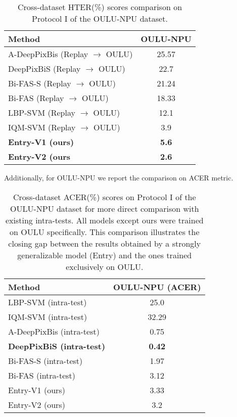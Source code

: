 \documentclass[10pt,twocolumn,letterpaper]{article}
\begin{document}
\begin{table}[h]
  \centering
  \begin{tabular}{@{}lc@{}}
    \toprule
    \textbf{Method} & \textbf{OULU-NPU} \\
    \midrule
    \midrule
    A-DeepPixBis (Replay $\rightarrow$ OULU)\cite{DeepPixBis} & 25.57 \\
    DeepPixBiS (Replay $\rightarrow$ OULU)\cite{DeepPix} & 22.7 \\
    Bi-FAS-S (Replay $\rightarrow$ OULU)\cite{Bi-FPNFAS} & 21.24 \\
    Bi-FAS (Replay $\rightarrow$ OULU)\cite{Bi-FPNFAS} & 18.33 \\
    LBP-SVM (Replay $\rightarrow$ OULU)\cite{DeepPix} & 12.1 \\
    IQM-SVM (Replay $\rightarrow$ OULU)\cite{IQM} & 3.9 \\
    \textbf{Entry-V1 (ours)} & \textbf{5.6} \\
    \textbf{Entry-V2 (ours} & \textbf{2.6} \\
    \bottomrule
  \end{tabular}
  \caption{Cross-dataset HTER(\%) scores comparison on Protocol I of the OULU-NPU dataset.}
  \label{tab:cross-test}
\end{table}

Additionally, for OULU-NPU we report the comparison on ACER metric.

\begin{table}[h]
  \centering
  \begin{tabular}{@{}lc@{}}
    \toprule
    \textbf{Method} & \textbf{OULU-NPU (ACER)} \\
    \midrule
    \midrule
    LBP-SVM (intra-test)\cite{DeepPix} & 25.0 \\
    IQM-SVM (intra-test)\cite{IQM} & 32.29 \\
    A-DeepPixBis (intra-test)\cite{DeepPixBis} & 0.75 \\
    \textbf{DeepPixBiS (intra-test)}\cite{DeepPix} & \textbf{0.42} \\
    Bi-FAS-S (intra-test)\cite{Bi-FPNFAS} & 1.97\\
    Bi-FAS (intra-test)\cite{Bi-FPNFAS} & 3.12\\
    Entry-V1 (ours) & 3.33 \\
    Entry-V2 (ours) & 3.2 \\
    \bottomrule
  \end{tabular}
  \caption{Cross-dataset ACER(\%) scores on Protocol I of the OULU-NPU dataset for more direct comparison with existing intra-tests. All models except ours were trained on OULU specifically. This comparison illustrates the closing gap between the results obtained by a strongly generalizable model (Entry) and the ones trained exclusively on OULU.}
  \label{tab:cross-test}
\end{table}
\end{document}

